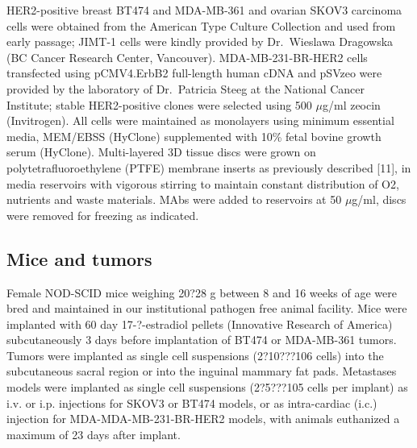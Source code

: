 HER2-positive breast BT474 and MDA-MB-361 and ovarian SKOV3 carcinoma cells were obtained from the American Type Culture Collection and used from early passage; JIMT-1 cells were kindly provided by Dr.\
Wieslawa Dragowska (BC Cancer Research Center, Vancouver).
MDA-MB-231-BR-HER2 cells transfected using pCMV4.ErbB2 full-length human cDNA and pSVzeo were provided by the laboratory of Dr.\
Patricia Steeg at the National Cancer Institute; stable HER2-positive clones were selected using 500 $\mu$g/ml zeocin (Invitrogen).
All cells were maintained as monolayers using minimum essential media, MEM/EBSS (HyClone) supplemented with 10\% fetal bovine growth serum (HyClone).
Multi-layered 3D tissue discs were grown on polytetrafluoroethylene (PTFE) membrane inserts as previously described [11], in media reservoirs with vigorous stirring to maintain constant distribution of O2, nutrients and waste materials.
MAbs were added to reservoirs at 50 $\mu$g/ml, discs were removed for freezing as indicated.

\subsection{Mice and tumors}

Female NOD-SCID mice weighing 20?28 g between 8 and 16 weeks of age were bred and maintained in our institutional pathogen free animal facility.
Mice were implanted with 60 day 17-?-estradiol pellets (Innovative Research of America) subcutaneously 3 days before implantation of BT474 or MDA-MB-361 tumors.
Tumors were implanted as single cell suspensions (2?10???106 cells) into the subcutaneous sacral region or into the inguinal mammary fat pads.
Metastases models were implanted as single cell suspensions (2?5???105 cells per implant) as i.v.
or i.p.
injections for SKOV3 or BT474 models, or as intra-cardiac (i.c.) injection for MDA-MDA-MB-231-BR-HER2 models, with animals euthanized a maximum of 23 days after implant.

